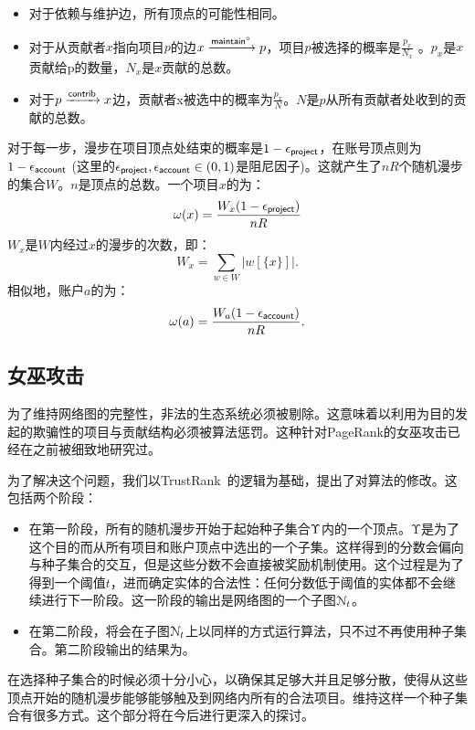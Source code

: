 \begin{itemize}
\item 对于依赖与维护边，所有顶点的可能性相同。
\item 对于从贡献者$x$指向项目$p$的边$x \xrightarrow[]{\mathsf{maintain}^\circ} p$，项目$p$被选择的概率是$\frac{p_x}{N_x}$ 。$p_x$是$x$贡献给p的数量，$N_x$是$x$贡献的总数。
\item   对于$p \xrightarrow[]{\mathsf{contrib}} x$边，贡献者x被选中的概率为$\frac{p_x}{N}$。$N$是$p$从所有贡献者处收到的贡献的总数。
\end{itemize}

\noindent 对于每一步，漫步在项目顶点处结束的概率是$1 - \epsilon_{\mathsf{project}}$，在账号顶点则为$1 - \epsilon_{\mathsf{account}}$ (这里的$\epsilon_{\mathsf{project}}, \epsilon_{\mathsf{account}} \in (0,1)$是阻尼因子)。这就产生了$nR$个随机漫步的集合$W$。$n$是顶点的总数。一个项目$x$的\osrank{}为：
\[
  \omega(x) = \frac{W_x (1-\epsilon_{\mathsf{project}})}{n R}
\]
$W_x$是$W$内经过$x$的漫步的次数，即：
\[
  W_x = \sum_{w \in W} |w[\{x\}]|.
\]
相似地，账户$a$的\osrank{}为：
\[
  \omega(a) = \frac{W_a (1-\epsilon_{\mathsf{account}})}{n R}.
\]

\subsection{女巫攻击}

为了维持\oscoin{}网络图的完整性，非法的生态系统必须被剔除。这意味着以利用\osrank{}为目的发起的欺骗性的项目与贡献结构必须被算法惩罚。这种针对PageRank的女巫攻击已经在之前被细致地研究过。

为了解决这个问题，我们以TrustRank~\cite{trustrank}的逻辑为基础，提出了对\pagerank{}算法的修改。这包括两个阶段：

\begin{itemize}
\item   在第一阶段，所有的随机漫步开始于起始种子集合$\Upsilon$内的一个顶点。Υ是为了这个目的而从所有项目和账户顶点中选出的一个子集。这样得到的分数会偏向与种子集合的交互，但是这些分数不会直接被奖励机制使用。这个过程是为了得到一个阈值$t$，进而确定实体的合法性：任何分数低于阈值的实体都不会继续进行下一阶段。这一阶段的输出是网络图的一个子图$\mathcal{N}_t$。
\item 在第二阶段，将会在子图$\mathcal{N}_t$上以同样的方式运行算法，只不过不再使用种子集合。第二阶段输出的结果为\osrank{}。
\end{itemize}
在选择种子集合的时候必须十分小心，以确保其足够大并且足够分散，使得从这些顶点开始的随机漫步能够能够触及到网络内所有的合法项目。维持这样一个种子集合有很多方式。这个部分将在今后进行更深入的探讨。

